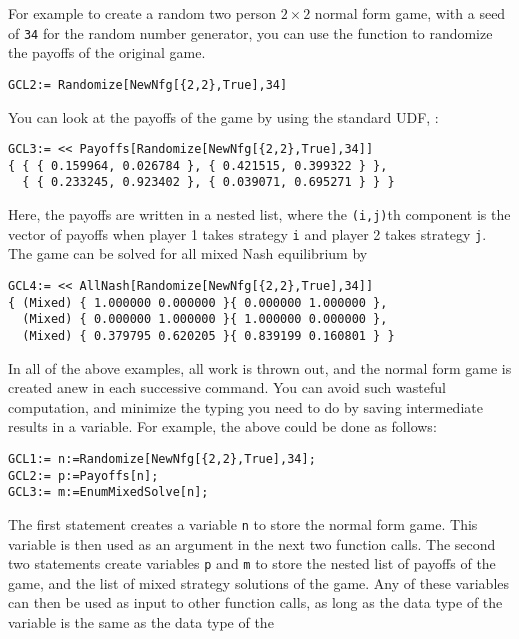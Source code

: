 For example to create a random two person $2\times 2$ normal form
game, with a seed of \verb+34+ for the random number generator, you can
use the function  to randomize the payoffs of the
original game.

\begin{verbatim}
GCL2:= Randomize[NewNfg[{2,2},True],34]
\end{verbatim}  

\noindent
You can look at the payoffs of the game by using the standard UDF,
:

\begin{verbatim}
GCL3:= << Payoffs[Randomize[NewNfg[{2,2},True],34]]
{ { { 0.159964, 0.026784 }, { 0.421515, 0.399322 } },
  { { 0.233245, 0.923402 }, { 0.039071, 0.695271 } } }
\end{verbatim}  

\noindent
Here, the payoffs are written in a nested list, where the
\verb+(i,j)+th component is the vector of payoffs when player 1 takes
strategy \verb+i+ and player 2 takes strategy \verb+j+.  The game can
be solved for all mixed Nash equilibrium by

\begin{verbatim}
GCL4:= << AllNash[Randomize[NewNfg[{2,2},True],34]]
{ (Mixed) { 1.000000 0.000000 }{ 0.000000 1.000000 },
  (Mixed) { 0.000000 1.000000 }{ 1.000000 0.000000 },
  (Mixed) { 0.379795 0.620205 }{ 0.839199 0.160801 } }
\end{verbatim}

In all of the above examples, all work is thrown out, and the normal
form game is created anew in each successive command.  You can avoid
such wasteful computation, and minimize the typing you need to do by
saving intermediate results in a variable.  For example, the above
could be done as follows:

\begin{verbatim}
GCL1:= n:=Randomize[NewNfg[{2,2},True],34];
GCL2:= p:=Payoffs[n];
GCL3:= m:=EnumMixedSolve[n];
\end{verbatim}

The first statement creates a variable \verb+n+ to store the normal
form game.  This variable is then used as an argument in the next two
function calls.  The second two statements create variables \verb+p+
and \verb+m+ to store the nested list of payoffs of the game, and the
list of mixed strategy solutions of the game.  Any of these variables
can then be used as input to other function calls, as long as the data
type of the variable is the same as the data type of the 

